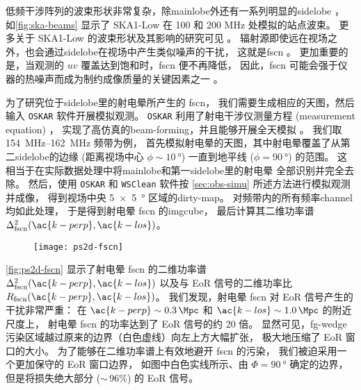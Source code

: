 低频干涉阵列的波束形状非常复杂，除\ac{mainlobe}外还有一系列明显的\ac{sidelobe}
\cite{noordam2004,wijnholds2010}，
如\autoref{fig:ska-beams} 显示了 SKA1-Low 在 100 和 200 MHz 处模拟的站点波束。
更多关于 SKA1-Low 的波束形状及其影响的研究可见 。
辐射源即使远在视场之外，也会通过\ac{sidelobe}在视场中产生类似噪声的干扰，
这就是\acf{fscn} \cite{smirnov2012}。
更加重要的是，当观测的 $uv$ 覆盖达到饱和时，\ac{fscn} 便不再降低，
因此，\ac{fscn} 可能会强于仪器的热噪声而成为制约成像质量的关键因素之一 \cite{mort2017}。

为了研究位于\ac{sidelobe}里的射电晕所产生的 \ac{fscn}，
我们需要生成相应的天图，然后输入 \texttt{OSKAR} 软件开展模拟观测。
\texttt{OSKAR} 利用了射电干涉仪测量方程 (measurement equation) \cite{smirnov2011}，
实现了高仿真的\ac{beam-forming}，并且能够开展全天模拟 \cite{mort2010}。
我们取 \SIrange{154}{162}{\MHz} 频带为例，
首先模拟射电晕的天图，其中射电晕覆盖了从第二\ac{sidelobe}的边缘
(距离视场中心 $\phi \sim \SI{10}{\degree}$)
一直到地平线 ($\phi = \SI{90}{\degree}$) 的范围。
这相当于在实际数据处理中将\ac{mainlobe}和第一\ac{sidelobe}里的射电晕
全部识别并完全去除。
然后，使用 \texttt{OSKAR} 和 \texttt{WSClean} 软件按
\autoref{sec:obs-simu} 所述方法进行模拟观测并成像，
得到视场中央 \SI{5 x 5}{\degree} 区域的\ac{dirty-map}。
对频带内的所有频率\ac{channel}均如此处理，
于是得到射电晕 \ac{fscn} 的\ac{imgcube}，
最后计算其二维功率谱 $\Delta^2_{\R{fscn}}(\ac{k-perp}, \ac{k-los})$。

\begin{figure}[htp]
  \centering
  \texttt{[image: ps2d-fscn]}
  \label{fig:ps2d-fscn}
\end{figure}

\autoref{fig:ps2d-fscn} 显示了射电晕 \ac{fscn}
的二维功率谱 $\Delta^2_{\R{fscn}}(\ac{k-perp}, \ac{k-los})$
以及与 EoR 信号的二维功率比 $R_{\R{fscn}}(\ac{k-perp}, \ac{k-los})$。
我们发现，射电晕 \ac{fscn} 对 EoR 信号产生的干扰非常严重：
在 $\ac{k-perp} \sim \SI{0.3}{\per\Mpc}$
和 $\ac{k-los} \sim \SI{1.0}{\per\Mpc}$ 的附近尺度上，
射电晕 \ac{fscn} 的功率达到了 EoR 信号的约 20 倍。
显然可见，\ac{fg-wedge}污染区域越过原来的边界（白色虚线）向左上方大幅扩张，
极大地压缩了 EoR 窗口的大小。
为了能够在二维功率谱上有效地避开 \ac{fscn} 的污染，
我们被迫采用一个更加保守的 EoR 窗口边界，
如图中白色实线所示、由 $\Phi = \SI{90}{\degree}$ 确定的边界，
但是将损失绝大部分 ($\sim$\,96\%) 的 EoR 信号。

